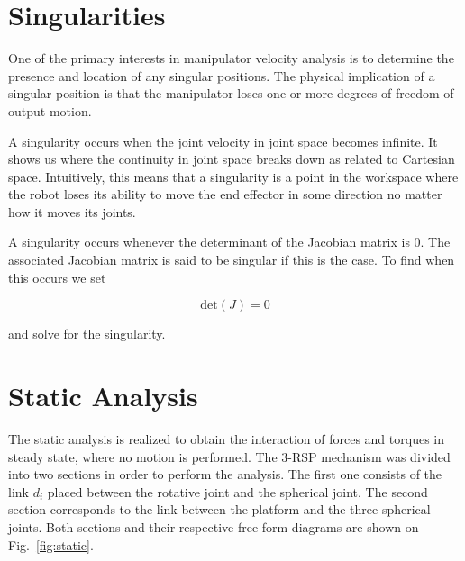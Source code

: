 \documentclass[titlepage, letterpaper]{article}
\begin{document}
\section{Singularities}
\label{sec:singular}

One of the primary interests in manipulator velocity analysis is to determine the presence and location of any singular positions.
The physical implication of a singular position is that the manipulator loses one or more degrees of freedom of output motion.

A singularity occurs when the joint velocity in joint space becomes infinite.
It shows us where the continuity in joint space breaks down as related to Cartesian space.
Intuitively, this means that a singularity is a point in the workspace where the robot loses its ability to move the end effector in some direction no matter how it moves its joints.

A singularity occurs whenever the determinant of the Jacobian matrix is 0.
The associated Jacobian matrix is said to be singular if this is the case.
To find when this occurs we set

\begin{equation}
\label{eq:singular_det0}
    \text{det}(J) = 0
\end{equation}

and solve for the singularity.

\section{Static Analysis}
\label{sec:static}

The static analysis is realized to obtain the interaction of forces and torques in steady state, where no motion is performed.
The 3-RSP mechanism was divided into two sections in order to perform the analysis.
The first one consists of the link $d_i$ placed between the rotative joint and the spherical joint.
The second section corresponds to the link between the platform and the three spherical joints. Both sections and their respective free-form diagrams are shown on Fig.~\ref{fig:static}.
\end{document}
